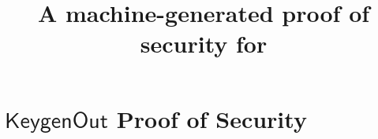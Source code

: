 \documentclass[11pt]{article}
\begin{document}


\newtheorem{definition}{Definition}
\newtheorem{theorem}{Theorem}
\newcommand{\Oracle}{\mathcal{O}}
\newcommand{\Adv}{\mathcal{A}}
\newcommand{\Bdv}{\mathcal{B}}
\newcommand{\MS}{\mathcal{M}}
\newcommand{\Psetup}{\mathsf{PSetup}}
\newcommand{\Msetup}{\mathsf{Setup}}
\newcommand{\params}{\mathit{params}}
\newcommand{\brk}[1]{\langle #1 \rangle}
\newcommand{\ait}[1]{#1}
\newcommand{\G}{\ait{\mathbb{G}}}
\newcommand{\ga}{\ait{g}_1}
\newcommand{\ha}{\ait{h}_1}
\newcommand{\poly}{\mathrm{poly}}

\newcommand{\bit}[1]{#1}
\newcommand{\gb}{\bit{g}_2}
\newcommand{\hb}{\bit{h}_2}

\newcommand{\cit}[1]{#1}
\newcommand{\Gc}{\cit{\Group_T}}
\newcommand{\gc}{\cit{g}}
\newcommand{\hc}{\cit{h}}
\newcommand{\Zp}{{\mathbb{Z}_p}}

\newcommand{\Group}{\ensuremath{\mathbb{G}}\xspace}
\newcommand{\Hroup}{\ensuremath{\mathbb{H}}\xspace}
\newcommand{\map}{\mathbf{e}}

\newcommand{\prot}{\mathsf{Prot}}
\newcommand{\auxext}{\mathit{auxext}}
\newcommand{\auxsim}{\mathit{auxsim}}
\newcommand{\aux}{\mathit{aux}}
\newcommand{\state}{\mathit{state}}
\newcommand{\Alg}{\mathsf{Alg}}
\newcommand{\A}{\mathcal{A}}

\newcommand{\Sig}{\mathsf{Sig}}
\newcommand{\Gen}{\mathsf{Gen}}
\newcommand{\TK}{\mathsf{TK}}
\newcommand{\pseudokey}{{\sf TK}_{sim}}
\newcommand{\SK}{\mathsf{SK}}
\newcommand{\PK}{\mathsf{PK}}
\newcommand{\MSK}{\mathsf{MSK}}
\newcommand{\CT}{\mathsf{CT}}
\newcommand{\Screen}{\mathsf{Screen}}
\newcommand{\Setup}{\mathsf{Setup}}
\newcommand{\Keygen}{\mathsf{Keygen}}
\newcommand{\KeygenOut}{\mathsf{KeygenOut}}
\newcommand{\Transform}{\mathsf{Transform}}
\newcommand{\Decrypt}{\mathsf{Decrypt}}
\newcommand{\Decout}{\mathsf{DecOut}}
\newcommand{\compareequals}{\stackrel{?}{=}}
\newcommand{\numsigs}{\eta}

\title{A machine-generated proof of security for {\schemename}}
\author{}
\date{}
\maketitle

\section{$\KeygenOut$ Proof of Security}
\end{document}
